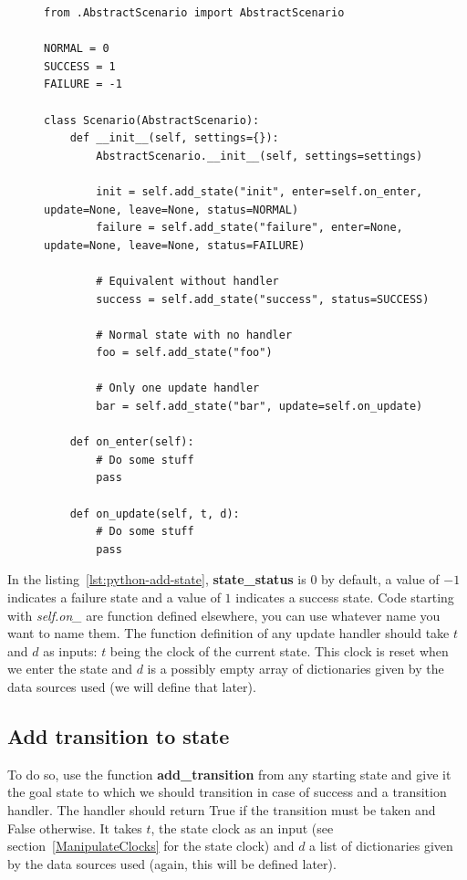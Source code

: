 \documentclass[12pt]{article}
\theoremstyle{definition}
\theoremstyle{definition}
\theoremstyle{remark}
\begin{document}
\begin{figure}[H]
    \begin{lstlisting}[caption="Various usage of self.add\_state",label={lst:python-add-state-examples}]
from .AbstractScenario import AbstractScenario

NORMAL = 0
SUCCESS = 1
FAILURE = -1

class Scenario(AbstractScenario):
    def __init__(self, settings={}):
        AbstractScenario.__init__(self, settings=settings)

        init = self.add_state("init", enter=self.on_enter, update=None, leave=None, status=NORMAL)
        failure = self.add_state("failure", enter=None, update=None, leave=None, status=FAILURE)

        # Equivalent without handler
        success = self.add_state("success", status=SUCCESS)

        # Normal state with no handler
        foo = self.add_state("foo")

        # Only one update handler
        bar = self.add_state("bar", update=self.on_update)

    def on_enter(self):
        # Do some stuff
        pass

    def on_update(self, t, d):
        # Do some stuff
        pass
    \end{lstlisting}
\end{figure}

In the listing~\ref{lst:python-add-state}, \textbf{state\_status} is $0$ by default, a value of $-1$ indicates a failure state and a value of $1$ indicates a success state. Code starting with \textit{self.on\_} are function defined elsewhere, you can use whatever name you want to name them. The function definition of any update handler should take $t$ and $d$ as inputs: $t$ being the clock of the current state. This clock is reset when we enter the state and $d$ is a possibly empty array of dictionaries given by the data sources used (we will define that later).



\subsection{Add transition to state}

To do so, use the function \textbf{add\_transition} from any starting state and give it the goal state to which we should transition in case of success and a transition handler. The handler should return True if the transition must be taken and False otherwise. It takes $t$, the state clock as an input (see section~\ref{ManipulateClocks} for the state clock) and $d$ a list of dictionaries given by the data sources used (again, this will be defined later).
\end{document}
